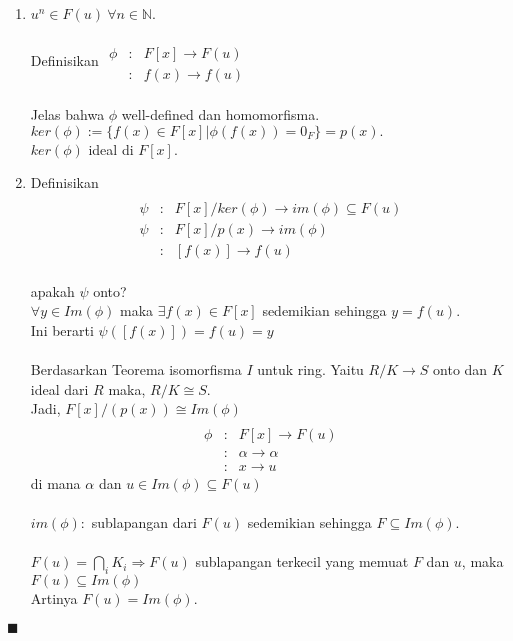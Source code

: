 \begin{enumerate}
\item $u^n \in F(u)~ \forall n \in \mathbb{N}$.
\par Definisikan
$\begin{array}{rcl}
\\ \phi&:&F[x] \to F(u)
\\ &:& f(x) \to f(u)
\end{array}$
\\
\\Jelas bahwa $\phi$ well-defined dan homomorfisma.
\\ $ker( \phi ):=\{f(x) \in F[x]| \phi (f(x))=0_F\}=p(x).$
\\ $ker ( \phi )$ ideal di $F[x]$.
\item \par Definisikan
$$\begin{array}{rcl}
\\ \psi&:&F[x]/ker( \phi ) \to im( \phi ) \subseteq F(u)
\\ \psi&:& F[x]/p(x) \to im( \phi )
\\ &:&[f(x)] \to f(u)
\end{array}$$
\\
apakah $\psi$ onto? 
\\ $\forall y \in Im( \phi )$ maka $\exists f(x) \in F[x]$ sedemikian sehingga $y=f(u)$.
\\ Ini berarti $\psi ([f(x)])=f(u)=y$
\\
\\ Berdasarkan Teorema isomorfisma $I$ untuk ring. Yaitu $R/K \to S$ onto dan $K$ ideal dari $R$ maka, $R/K \cong S$.
\\Jadi, $F[x]/(p(x)) \cong Im( \phi )$
\\
$$\begin{array}{rcl}
\\ \phi&:&F[x] \to F(u)
\\ &:& \alpha \to \alpha
\\ &:& x \to u
\end{array}$$ di mana $\alpha$ dan $u \in Im( \phi ) \subseteq F(u)$
\\
\\ $im( \phi ):$ sublapangan dari $F(u)$ sedemikian sehingga $F \subseteq Im( \phi )$.
\\
\\ $F(u)= \bigcap^{}_{i}K_i \Rightarrow F(u)$ sublapangan terkecil yang memuat $F$ dan $u$, maka $F(u) \subseteq Im( \phi )$
\\ Artinya $F(u)=Im( \phi )$.
\end{enumerate} $\blacksquare$

